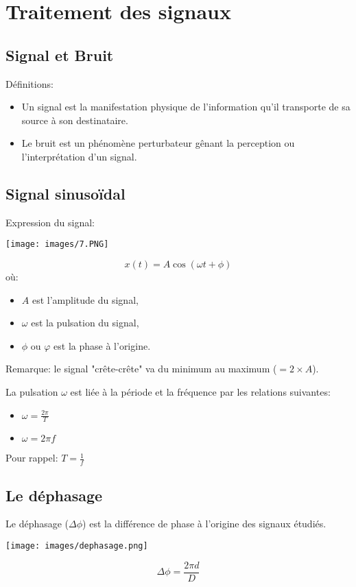 \documentclass[a4paper]{article}
\begin{document}
\section{Traitement des signaux}

\subsection{Signal et Bruit}

Définitions:
\begin{itemize}
    \item Un signal est la manifestation physique de l'information qu'il transporte de sa source à son destinataire.
    \item Le bruit est un phénomène perturbateur gênant la perception ou l'interprétation d'un signal.
    
\end{itemize}

\subsection{Signal sinusoïdal}

Expression du signal:
\begin{center}
    \texttt{[image: images/7.PNG]}
\end{center}
\[ x(t) = A \cos( \omega t + \phi) \]
où:
\begin{itemize}
    \item $ A $ est l'amplitude du signal,
    \item $ \omega $ est la pulsation du signal,
    \item $ \phi $ ou $ \varphi $ est la phase à l'origine.
\end{itemize}
Remarque: le signal "crête-crête" va du minimum au maximum ($= 2 \times A $).


La pulsation $ \omega $ est liée à la période et la fréquence par les relations suivantes:
\begin{itemize}
    \item $\displaystyle \omega = \frac{2 \pi}{T} $
    \item $ \omega = 2 \pi f $
\end{itemize}
Pour rappel: $\displaystyle T = \frac{1}{f} $

\subsection{Le déphasage}
Le déphasage ($ \Delta \phi $) est la différence de phase à l’origine des signaux étudiés.
\begin{center}
    \texttt{[image: images/dephasage.png]}
\end{center}
\[ \Delta \phi = \frac{2 \pi d}{D} \]
\end{document}
